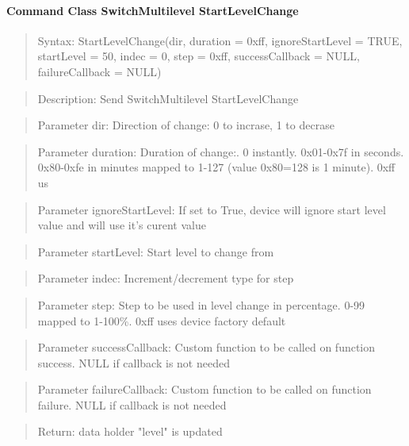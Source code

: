 \paragraph { Command Class SwitchMultilevel StartLevelChange}
\begin{quote} Syntax: StartLevelChange(dir, duration = 0xff, ignoreStartLevel = TRUE, startLevel = 50, indec = 0, step = 0xff, successCallback = NULL, failureCallback = NULL)\end{quote}
\begin{quote} Description: Send SwitchMultilevel StartLevelChange\end{quote}
\begin{quote} Parameter dir: Direction of change: 0 to incrase, 1 to decrase\end{quote}
\begin{quote} Parameter duration: Duration of change:. 0 instantly. 0x01-0x7f in seconds. 0x80-0xfe in minutes mapped to 1-127 (value 0x80=128 is 1 minute). 0xff us\end{quote}
\begin{quote} Parameter ignoreStartLevel: If set to True, device will ignore start level value and will use it's curent value\end{quote}
\begin{quote} Parameter startLevel: Start level to change from\end{quote}
\begin{quote} Parameter indec: Increment/decrement type for step\end{quote}
\begin{quote} Parameter step: Step to be used in level change in percentage. 0-99 mapped to 1-100\%. 0xff uses device factory default\end{quote}
\begin{quote} Parameter successCallback: Custom function to be called on function success. NULL if callback is not needed\end{quote}
\begin{quote} Parameter failureCallback: Custom function to be called on function failure. NULL if callback is not needed\end{quote}
\begin{quote} Return: data holder "level" is updated\end{quote} 


